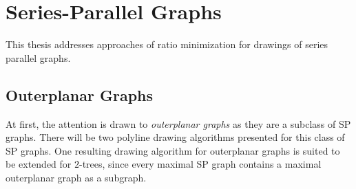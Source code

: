 \section{Series-Parallel Graphs}

This thesis addresses approaches of ratio minimization for drawings of series parallel graphs. 

\subsection{Outerplanar Graphs}

At first, the attention is drawn to \emph{outerplanar graphs} as they are a subclass of SP graphs. There will be two polyline drawing algorithms presented for this class of SP graphs. One resulting drawing algorithm for outerplanar graphs is suited to be extended for $2$-trees, since every maximal SP graph contains a maximal outerplanar graph as a subgraph.

